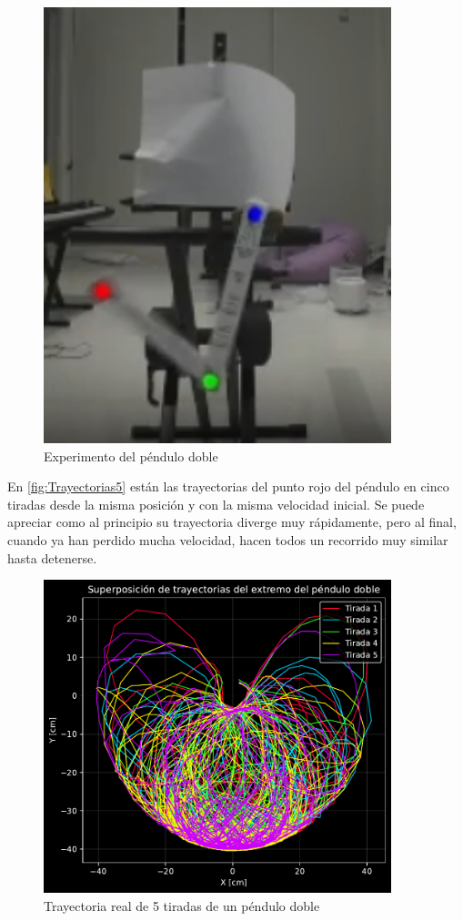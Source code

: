 \documentclass[
  10pt,
  a4paper,
  DIV=11,
  numbers=noendperiod,
  open=any]{scrreprt}
\numberwithin{equation}{chapter}
\numberwithin{equation}{section}
\renewcommand{\[}{\begin{equation}}
\renewcommand{\]}{\end{equation}}
\begin{document}
\begin{figure}[h]
  \centering
  \includegraphics[width=0.9\textwidth]{02-pendulo-doble/DobleReal.png}
  \caption{Experimento del péndulo doble}
\end{figure}


En \autoref{fig:Trayectorias5} están las trayectorias del punto rojo del péndulo en cinco tiradas
desde la misma posición y con la misma velocidad inicial. Se puede
apreciar como al principio su trayectoria diverge muy rápidamente, pero
al final, cuando ya han perdido mucha velocidad, hacen todos un
recorrido muy similar hasta detenerse.


\begin{figure}[h]
  \centering
  \includegraphics[width=0.9\textwidth]{02-pendulo-doble/experimentos_files/figure-pdf/cell-2-output-1.pdf}
  \caption{Trayectoria real de 5 tiradas de un péndulo doble}
  \label{fig:Trayectorias5}
\end{figure}
\end{document}
